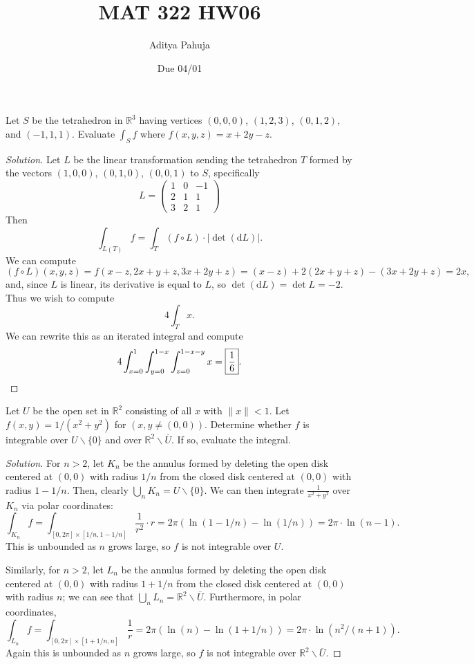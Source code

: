 \documentclass[10pt]{scrartcl}
\title{\vspace{-2em}MAT 322 HW06}
\author{\large Aditya Pahuja}
\date{\large Due 04/01}
\providecommand{\ol}{\overline}
\providecommand{\RR}{\mathbb R}
\providecommand{\setdiff}{\smallsetminus}
\newenvironment{soln}{\begin{proof}[Solution]}{\end{proof}}
\begin{document}
\maketitle

\begin{problem}
	Let $S$ be the tetrahedron in $\RR^3$ having vertices $(0,0,0)$,
	$(1,2,3)$, $(0,1,2)$, and $(-1,1,1)$.
	Evaluate $\int_Sf$ where $f(x,y,z) = x+2y-z$.
\end{problem}

\begin{soln}
	Let $L$ be the linear transformation sending
	the tetrahedron $T$ formed by the vectors $(1,0,0)$, $(0,1,0)$, $(0,0,1)$
	to $S$, specifically
	\[L = \begin{pmatrix}
		1&0&-1\\2&1&1\\3&2&1
	\end{pmatrix}\]
	Then
	\[\int_{L(T)}f = \int_T (f\circ L)\cdot |\det(\mathrm dL)|.\]
	We can compute
	\[(f\circ L)(x,y,z) = f(x-z,2x+y+z,3x+2y+z)
	= (x-z) + 2(2x + y + z) - (3x + 2y + z)
	= 2x,\]
	and, since $L$ is linear, its derivative is equal to $L$,
	so $\det(\mathrm dL) = \det L = -2$. Thus we wish to compute
	\[4\int_T x.\]
	We can rewrite this as an iterated integral and compute
	\[4\int_{x=0}^1 \int_{y=0}^{1-x} \int_{z=0}^{1-x-y} x
	= \boxed{\frac16}.\qedhere\]
\end{soln}

\begin{problem}
	Let $U$ be the open set in $\RR^2$ consisting of all $x$
	with $\|x\|<1$. Let $f(x,y) = 1/(x^2+y^2)$ for $(x,y\ne(0,0))$.
	Determine whether $f$ is integrable over $U\setdiff\{0\}$
	and over $\RR^2\setdiff\ol U$. If so, evaluate the integral.
\end{problem}

\begin{soln}
	For $n>2$, let $K_n$ be the annulus formed by
	deleting the open disk centered at $(0,0)$
	with radius $1/n$ from the closed disk centered at $(0,0)$
	with radius $1-1/n$.
	Then, clearly $\bigcup_n K_n = U\setdiff \{0\}$.
	We can then integrate $\frac1{x^2+y^2}$ over $K_n$ via polar coordinates:
	\[\int_{K_n} f
	= \int_{[0,2\pi]\times[1/n,1-1/n]} \frac{1}{r^2}\cdot r
	= 2\pi(\ln(1-1/n) - \ln(1/n)) = 2\pi\cdot\ln(n-1).\]
	This is unbounded as $n$ grows large, so $f$
	is not integrable over $U$.
	
	Similarly, for $n > 2$, let $L_n$ be the annulus formed by
	deleting the open disk centered at $(0,0)$ with radius $1+1/n$
	from the closed disk centered at $(0,0)$ with radius $n$;
	we can see that $\bigcup_nL_n =\RR^2\setdiff\ol U$.
	Furthermore, in polar coordinates,
	\[\int_{L_n} f = \int_{[0,2\pi]\times[1+1/n,n]} \frac{1}{r}
	= 2\pi(\ln(n) - \ln(1 + 1/n)) = 2\pi\cdot\ln(n^2/(n+1)).\]
	Again this is unbounded as $n$ grows large,
	so $f$ is not integrable over $\RR^2\setdiff\ol U$.
\end{soln}
\end{document}
